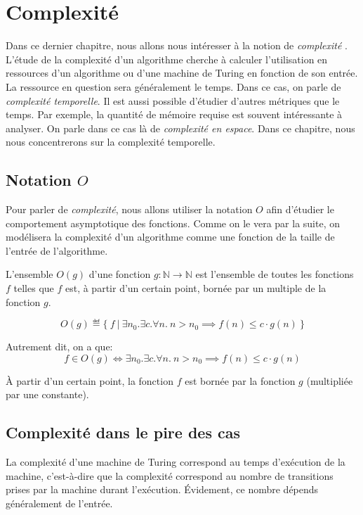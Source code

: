 \chapter{Complexité}

Dans ce dernier chapitre, nous allons nous intéresser à la notion de \og \textit{complexité} \fg{}.
L'étude de la complexité d'un algorithme cherche à calculer l'utilisation en ressources d'un algorithme ou d'une machine de Turing en fonction de son entrée.
La ressource en question sera généralement le temps.
Dans ce cas, on parle de \textit{complexité temporelle}.
Il est aussi possible d'étudier d'autres métriques que le temps.
Par exemple, la quantité de mémoire requise est souvent intéressante à analyser.
On parle dans ce cas là de \textit{complexité en espace}.
Dans ce chapitre, nous nous concentrerons sur la complexité temporelle.

\section{Notation $O$}

Pour parler de \textit{complexité}, nous allons utiliser la notation $O$ afin d'étudier le comportement asymptotique des fonctions. Comme on le vera par la suite, on modélisera la complexité d'un algorithme comme une fonction de la taille de l'entrée de l'algorithme.

L'ensemble $O(g)$ d'une fonction $g: \mathbb{N} \to \mathbb{N}$ est l'ensemble de toutes les fonctions $f$ telles que $f$ est, à partir d'un certain point, bornée par un multiple de la fonction $g$.

\[
O(g) \eqdef \{\ f\ |\ \exists n_0. \exists c. \forall n.\ n > n_0 \implies f(n) \leq c \cdot g(n)\ \}
\]

Autrement dit, on a que:
\[
f \in O(g) \iff \exists n_0. \exists c. \forall n.\ n > n_0 \implies f(n) \leq c \cdot g(n)
\]

À partir d'un certain point, la fonction $f$ est bornée par la fonction $g$ (multipliée par une constante).

\section{Complexité dans le pire des cas}

La complexité d'une machine de Turing correspond au temps d'exécution de la machine, c'est-à-dire que la complexité correspond au nombre de transitions prises par la machine durant l'exécution.
Évidement, ce nombre dépends généralement de l'entrée.

